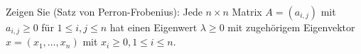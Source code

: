 Zeigen Sie (Satz von Perron-Frobenius): Jede $n\times n$ Matrix $A = (a_{i,j})$ mit $a_{i,j} \geq 0$ für
$1 \leq i, j \leq n$ hat einen Eigenwert $\lambda \geq 0$ mit zugehörigem Eigenvektor $x = (x_1,\dots,x_n)$
mit $x_i \geq 0, 1 \leq i \leq n$.